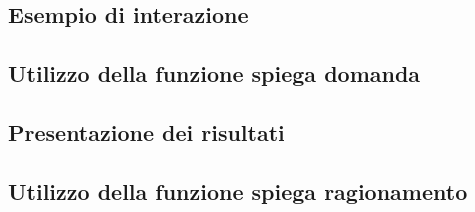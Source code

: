 \subsection{Esempio di interazione}

\subsection{Utilizzo della funzione spiega domanda}

\subsection{Presentazione dei risultati}

\subsection{Utilizzo della funzione spiega ragionamento}
